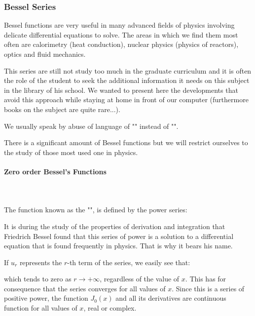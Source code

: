 	\pagebreak
	\subsubsection{Bessel Series}
	Bessel functions are very useful in many advanced fields of physics involving delicate differential equations to solve. The areas in which we find them most often are calorimetry (heat conduction), nuclear physics (physics of reactors), optics and fluid mechanics.
	
	This series are still not study too much in the graduate curriculum and it is often the role of the student to seek the additional information it needs on this subject in the library of his school. We wanted to present here the developments that avoid this approach while staying at home in front of our computer (furthermore books on the subject are quite rare...).
	
	\begin{tcolorbox}[title=Remark,colframe=black,arc=10pt]
	We usually speak by abuse of language of "\label{bessel functions}" instead of "".
	\end{tcolorbox}
	There is a significant amount of Bessel functions but we will restrict ourselves to the study of those most used one in physics.
	
	\paragraph{Zero order Bessel's Functions}\mbox{}\\\\
	The function known as the "", is defined by the power series:
	
	It is during the study of the properties of derivation and integration that Friedrich Bessel found that this series of power is a solution to a differential equation that is found frequently in physics. That is why it bears his name.
	
	If $u_r$ represents the $r$-th term of the series, we easily see that:
	
	which tends to zero as $r\rightarrow +\infty$, regardless of the value of $x$. This has for consequence that the series converges for all values of $x$. Since this is a series of positive power, the function $J_0(x)$ and all its derivatives are continuous function for all values of $x$, real or complex.
	
